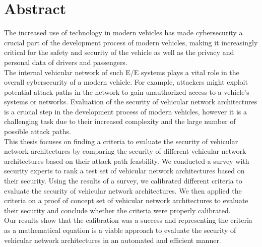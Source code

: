 
\chapter*{Abstract}\label{chp:abstract}

The increased use of technology in modern vehicles has made cybersecurity a crucial part of the development process of modern vehicles,
making it increasingly critical for the safety and security of the vehicle as well as the privacy and personal data of drivers and passengers.\\

The internal vehicular network of such E/E systems plays a vital role in the overall cybersecurity of a modern vehicle.
For example, attackers might exploit potential attack paths in the network to gain unauthorized access to a vehicle's systems or networks.
Evaluation of the security of vehicular network architectures is a crucial step in the development process of modern vehicles,
however it is a challenging task due to their increased complexity and the large number of possible attack paths.\\

This thesis focuses on finding a criteria to evaluate the security of vehicular network architectures by
comparing the security of different vehicular network architectures based on their attack path feasbility.
We conducted a survey with security experts to rank a test set of vehicular network architectures based on their security.
Using the results of a survey, we calibrated different criteria to evaluate the security of vehicular network architectures. 
We then applied the criteria on a proof of concept set of vehicular network architectures to evaluate their security and conclude whether the criteria were properly calibrated.\\

Our results show that the calibration was a success and representing the criteria as a mathematical equation is a 
viable approach to evaluate the security of vehicular network architectures in an automated and efficient manner.
